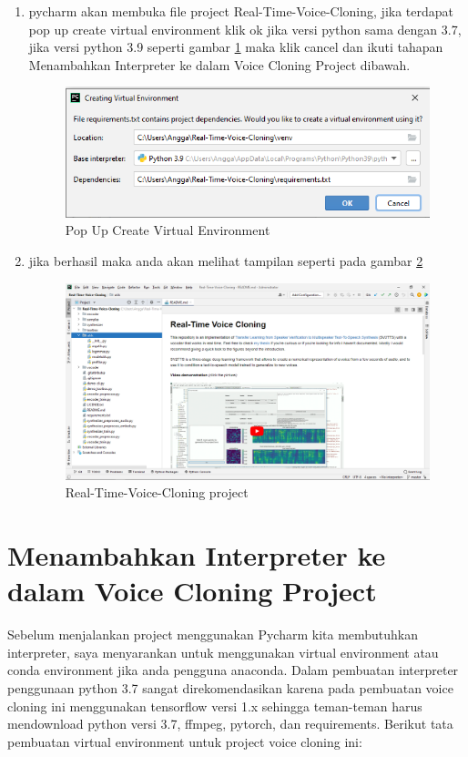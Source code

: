 \begin{enumerate}
\item pycharm akan membuka file project Real-Time-Voice-Cloning, jika terdapat pop up create virtual environment klik ok jika versi python sama dengan 3.7, jika versi python 3.9 seperti gambar \ref{repo8} maka klik cancel dan ikuti tahapan Menambahkan Interpreter ke dalam Voice Cloning Project dibawah.
\begin{figure}[H]
\centering
\includegraphics[scale=.55]{figures/repo8}
\caption{Pop Up Create Virtual Environment}
\label{repo8}
\end{figure}

\item jika berhasil maka anda akan melihat tampilan seperti pada gambar \ref{repo9}
\begin{figure}[H]
\centering
\includegraphics[scale=.3]{figures/repo9}
\caption{Real-Time-Voice-Cloning project}
\label{repo9}
\end{figure}

\end{enumerate}

\section{Menambahkan Interpreter ke dalam Voice Cloning Project} 
Sebelum menjalankan project menggunakan Pycharm kita membutuhkan interpreter, saya menyarankan untuk menggunakan virtual environment atau conda environment jika anda pengguna anaconda. Dalam pembuatan interpreter penggunaan python 3.7 sangat direkomendasikan karena pada pembuatan voice cloning ini menggunakan tensorflow versi 1.x sehingga teman-teman harus mendownload python versi 3.7, ffmpeg, pytorch, dan requirements.
Berikut tata pembuatan virtual environment untuk project voice cloning ini:

